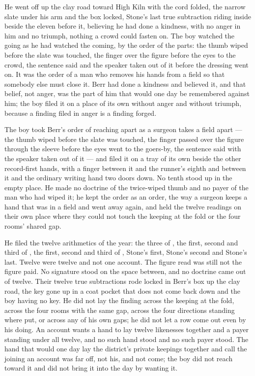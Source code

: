 He went off up the clay road toward High Kiln with the cord folded, the narrow slate under his arm and the box locked, Stone's last true subtraction riding inside beside the eleven before it, believing he had done a kindness, with no anger in him and no triumph, nothing a crowd could fasten on. The boy watched the going as he had watched the coming, by the order of the parts: the thumb wiped before the slate was touched, the finger over the figure before the eyes to the crowd, the sentence said and the speaker taken out of it before the dressing went on. It was the order of a man who removes his hands from a field so that somebody else must close it. Berr had done a kindness and believed it, and that belief, not anger, was the part of him that would one day be remembered against him; the boy filed it on a place of its own without anger and without triumph, because a finding filed in anger is a finding forged.

The boy took Berr's order of reaching apart as a surgeon takes a field apart --- the thumb wiped before the slate was touched, the finger passed over the figure through the sleeve before the eyes went to the goers-by, the sentence said with the speaker taken out of it --- and filed it on a tray of its own beside the other record-first hands, with a finger between it and the runner's eighth and between it and the ordinary writing hand two doors down. No tenth stood up in the empty place. He made no doctrine of the twice-wiped thumb and no payer of the man who had wiped it; he kept the order as an order, the way a surgeon keeps a hand that was in a field and went away again, and held the twelve readings on their own place where they could not touch the keeping at the fold or the four rooms' shared gap.

He filed the twelve arithmetics of the year: the three of , the first, second and third of , the first, second and third of , Stone's first, Stone's second and Stone's last. Twelve were twelve and not one account. The figure read was still not the figure paid. No signature stood on the space between, and no doctrine came out of twelve. Their twelve true subtractions rode locked in Berr's box up the clay road, the key gone up in a coat pocket that does not come back down and the boy having no key. He did not lay the finding across the keeping at the fold, across the four rooms with the same gap, across the four directions standing where put, or across any of his own gaps; he did not let a row come out even by his doing. An account wants a hand to lay twelve likenesses together and a payer standing under all twelve, and no such hand stood and no such payer stood. The hand that would one day lay the district's private keepings together and call the joining an account was far off, not his, and not come; the boy did not reach toward it and did not bring it into the day by wanting it.

